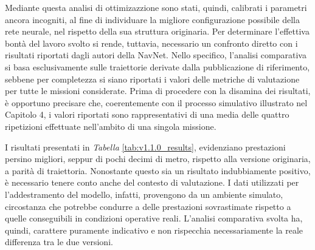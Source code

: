 Mediante questa analisi di ottimizazzione sono stati, quindi, calibrati i parametri ancora incogniti, al fine di individuare la migliore configurazione possibile della rete neurale, nel rispetto della sua struttura originaria. Per determinare l'effettiva bontà del lavoro svolto si rende, tuttavia, necessario un confronto diretto con i risultati riportati dagli autori della NavNet. Nello specifico, l'analisi comparativa si basa esclusivamente sulle traiettorie derivate dalla pubblicazione di riferimento, sebbene per completezza si siano riportati i valori delle metriche di valutazione per tutte le missioni considerate. Prima di procedere con la disamina dei risultati, è opportuno precisare che, coerentemente con il processo simulativo illustrato nel Capitolo 4, i valori riportati sono rappresentativi di una media delle quattro ripetizioni effettuate nell'ambito di una singola missione. 

I risultati presentati in \emph{Tabella} \ref{tab:v1.1.0_results}, evidenziano prestazioni persino migliori, seppur di pochi decimi di metro, rispetto alla versione originaria, a parità di traiettoria. Nonostante questo sia un risultato indubbiamente positivo, è necessario tenere conto anche del contesto di valutazione. I dati utilizzati per l'addestramento del modello, infatti, provengono da un ambiente simulato, circostanza che potrebbe condurre a delle prestazioni sovrastimate rispetto a quelle conseguibili in condizioni operative reali. L'analisi comparativa svolta ha, quindi, carattere puramente indicativo e non rispecchia necessariamente la reale differenza tra le due versioni. 


